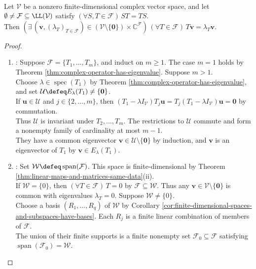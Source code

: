 \begin{theorem} \label{thm:commuting-family-common-eigenvector} \\
Let $\mathcal{V}$ be a nonzero finite-dimensional complex vector space, and let $\emptyset\neq\mathcal{F}\subseteq\LL(\mathcal{V})$ satisfy $(\forall S,T\in\mathcal{F})\,ST=TS$.\\
Then $(\exists\,(\mathbf{v},(\lambda_T)_{T\in\mathcal{F}})\in(\mathcal{V}\setminus\{\mathbf{0}\})\times\mathbb{C}^{\mathcal{F}})\,(\forall T\in\mathcal{F})\,T\mathbf{v}=\lambda_T\mathbf{v}$.
\begin{proof}
\begin{enumerate}[label=(\roman*)]
\setlength{\itemsep}{0pt}
\item {}: Suppose $\mathcal{F}=\{T_1,\ldots,T_m\}$, and induct on $m\geq1$. The case $m=1$ holds by Theorem \ref{thm:complex-operator-has-eigenvalue}. Suppose $m>1$.\\
Choose $\lambda\in\operatorname{spec}(T_1)$ by Theorem \ref{thm:complex-operator-has-eigenvalue}, and set $\mathcal{U}\defeq E_{\lambda}(T_1)\neq\{\mathbf{0}\}$.\\
If $\mathbf{u}\in\mathcal{U}$ and $j\in\{2,\ldots,m\}$, then $(T_1-\lambda I_{\mathcal{V}})T_j\mathbf{u}=T_j(T_1-\lambda I_{\mathcal{V}})\mathbf{u}=\mathbf{0}$ by commutation.\\
Thus $\mathcal{U}$ is invariant under $T_2,\ldots,T_m$. The restrictions to $\mathcal{U}$ commute and form a nonempty family of cardinality at most $m-1$.\\
They have a common eigenvector $\mathbf{v}\in\mathcal{U}\setminus\{\mathbf{0}\}$ by induction, and $\mathbf{v}$ is an eigenvector of $T_1$ by $\mathbf{v}\in E_{\lambda}(T_1)$.
\item {}: Set $\mathcal{W}\defeq\operatorname{span}(\mathcal{F})$. This space is finite-dimensional by Theorem \ref{thm:linear-maps-and-matrices-same-data}(ii).\\
If $\mathcal{W}=\{0\}$, then $(\forall T\in\mathcal{F})\,T=0$ by $\mathcal{F}\subseteq\mathcal{W}$. Thus any $\mathbf{v}\in\mathcal{V}\setminus\{\mathbf{0}\}$ is common with eigenvalues $\lambda_T=0$. Suppose $\mathcal{W}\neq\{0\}$.\\
Choose a basis $(R_1,\ldots,R_q)$ of $\mathcal{W}$ by Corollary \ref{cor:finite-dimensional-spaces-and-subspaces-have-bases}. Each $R_j$ is a finite linear combination of members of $\mathcal{F}$.\\
The union of their finite supports is a finite nonempty set $\mathcal{F}_0\subseteq\mathcal{F}$ satisfying $\operatorname{span}(\mathcal{F}_0)=\mathcal{W}$.

\end{enumerate}
\end{proof}
\end{theorem}
